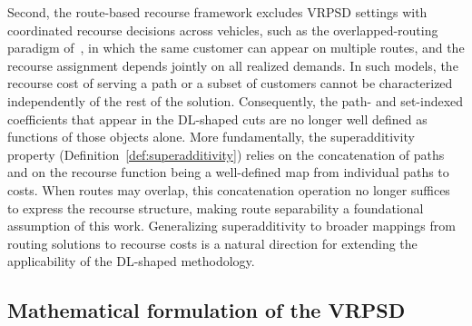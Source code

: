 \documentclass{article}
\begin{document}
{Second, the route-based recourse framework excludes VRPSD settings with coordinated recourse decisions across vehicles, such as the overlapped-routing paradigm of~\cite{ledvina2022new}, in which the same customer can appear on multiple routes, and the recourse assignment depends jointly on all realized demands. In such models, the recourse cost of serving a path or a subset of customers cannot be characterized independently of the rest of the solution. Consequently, the path- and set-indexed coefficients that appear in the DL-shaped cuts are no longer well defined as functions of those objects alone. More fundamentally, the superadditivity property (Definition~\ref{def:superadditivity}) relies on the concatenation of paths and on the recourse function being a well-defined map from individual paths to costs. When routes may overlap, this concatenation operation no longer suffices to express the recourse structure, making route separability a foundational assumption of this work. Generalizing superadditivity to broader mappings from routing solutions to recourse costs is a natural direction for extending the applicability of the DL-shaped methodology.
}

\subsection{Mathematical formulation of the VRPSD} \label{subsec:VRPSDform}
 
\end{document}
